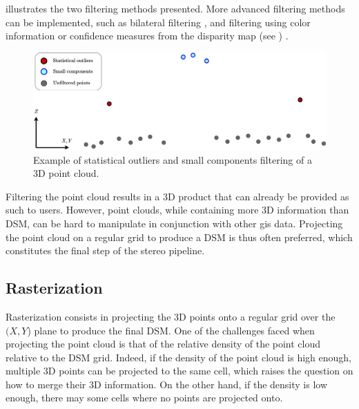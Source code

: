  illustrates the two filtering methods presented. More advanced filtering methods can be implemented, such as bilateral filtering \cite{digne_bilateral_2017}, and filtering using color information or confidence measures from the disparity map (see ) \cite{youssefi_geometrically_2024}.

\begin{figure}
    \centering
    \includegraphics[width=\linewidth]{Images/Chap_1/Point_cloud_filtering.png}
    \caption{Example of statistical outliers and small components filtering of a 3D point cloud.}
    \label{fig:point_cloud_filtering}
\end{figure}

Filtering the point cloud results in a 3D product that can already be provided as such to users. However, point clouds, while containing more 3D information than DSM, can be hard to manipulate in conjunction with other \acrshort{gis} data. Projecting the point cloud on a regular grid to produce a DSM is thus often preferred, which constitutes the final step of the stereo pipeline.

\subsection{Rasterization}\label{sec:rasterization}
Rasterization consists in projecting the 3D points onto a regular grid over the $(X,Y$) plane to produce the final DSM. One of the challenges faced when projecting the point cloud is that of the relative density of the point cloud relative to the DSM grid. Indeed, if the density of the point cloud is high enough, multiple 3D points can be projected to the same cell, which raises the question on how to merge their 3D information. On the other hand, if the density is low enough, there may some cells where no points are projected onto. 

